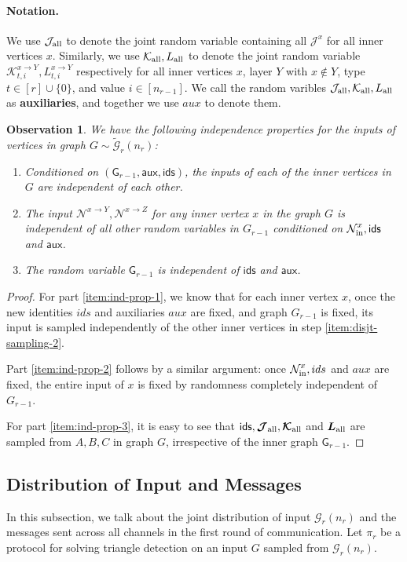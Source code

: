 \documentclass[11pt]{article}
\newtheorem{observation}[lemma]{Observation}
\theoremstyle{definition}
\newcommand{\rv}[1]{\ensuremath{{\mathsf{#1}}}\xspace}
\newcommand{\prot}{\ensuremath{\pi}}
\newcommand{\Nbhood}[3]{\ensuremath{\mathcal{N}^{#1_{#3} \to #2}}}
\newcommand{\Ninner}[2]{\ensuremath{\mathcal{N}_{\textnormal{in}}^{#1_{#2}}}}
\newcommand{\cG}{\ensuremath{\mathcal{G}}}
\newcommand{\cGtil}{\ensuremath{\widetilde{\cG}}}
\newcommand{\ids}{\ensuremath{ids}}
\newcommand{\aux}{\ensuremath{aux}}
\newcommand{\raux}{\ensuremath{\rv{aux}}}
\newcommand{\cJ}{\ensuremath{\mathcal{J}}}
\newcommand{\cK}{\ensuremath{\mathcal{K}}}
\newcommand{\cJup}[1]{\ensuremath{\cJ^{#1}}}
\newcommand{\cKupdown}[2]{\ensuremath{\cK^{#1}_{#2}}}
\newcommand{\Lupdown}[2]{\ensuremath{L^{#1}_{#2}}}
\newcommand{\cJall}{\ensuremath{\mathcal{J}_{\textnormal{all}}}}
\newcommand{\cKall}{\ensuremath{\mathcal{K_{\textnormal{all}}}}}
\newcommand{\Lall}{\ensuremath{L_{\textnormal{all}}}}
\newcommand{\rcJall}{\ensuremath{\bm{\mathcal{J}}_{\textnormal{all}}}}
\newcommand{\rcKall}{\ensuremath{\bm{\mathcal{K}}_{\textnormal{all}}}}
\newcommand{\rLall}{\ensuremath{\bm{L}_{\textnormal{all}}}}
\newcommand{\rG}{\ensuremath{\rv{G}}}
\newcommand{\rids}{\ensuremath{\rv{ids}}}
\begin{document}
\paragraph{Notation.}
We use $\cJall$ to denote the joint random variable containing all $\cJup{x}$ for all inner vertices $x$. Similarly, we use $\cKall, \Lall$ to denote the joint random variable $\cKupdown{x \to Y}{t, i}, \Lupdown{x \to Y}{t, i}$ respectively for all inner vertices $x$, layer $Y$ with $x \notin Y$, type $t \in [r] \cup \{0\}$, and value $i \in [n_{r-1}]$. 
We call the random varibles $\cJall, \cKall, \Lall$ as \textbf{auxiliaries}, and together we use $\aux$ to denote them.

\begin{observation}\label{obs:input-indep}
		We have the following independence properties for the inputs of vertices in graph $G \sim \cGtil_r(n_r)$:
	\begin{enumerate}[label=$(\roman*)$]
		\item \label{item:ind-prop-1} Conditioned on $(\rG_{r-1},\raux, \rids)$, the inputs of each of the inner vertices in $G$ are independent of each other. 
		\item \label{item:ind-prop-2} The input $\Nbhood{x}{Y}{}, \Nbhood{x}{Z}{}$ for any inner vertex $x$ in the graph $G$ is independent of all other random variables in $G_{r-1}$ conditioned on $\Ninner{x}{}, \rids$ and $\raux$. 
		\item \label{item:ind-prop-3} The random variable $\rG_{r-1}$ is independent of $\rids$ and $\raux$. 
	\end{enumerate}
\end{observation}
\begin{proof}
	For part \ref{item:ind-prop-1}, we know that for each inner vertex $x$, once the new identities $\ids$ and auxiliaries $\aux$ are fixed, and graph $G_{r-1}$ is fixed, its input is sampled independently of the other inner vertices in step \ref{item:disjt-sampling-2}.
	
	Part \ref{item:ind-prop-2} follows by a similar argument: once $\Ninner{x}{}, \ids$ and $\aux$ are fixed, the entire input of $x$ is fixed by randomness completely independent of $G_{r-1}$. 
	
	For part \ref{item:ind-prop-3}, it is easy to see that $\rids, \rcJall, \rcKall $ and $\rLall$ are sampled from $A, B, C$ in graph $G$, irrespective of the inner graph $\rG_{r-1}$. 
\end{proof}

\subsection{Distribution of Input and Messages}\label{subsec:dist-input-message}
In this subsection, we talk about the joint distribution of input $\cG_r(n_r)$ and the messages sent across all channels in the first round of communication. 
Let $\prot_r$ be a protocol for solving triangle detection on an input $G $ sampled from $\cG_r(n_r)$.
\end{document}
